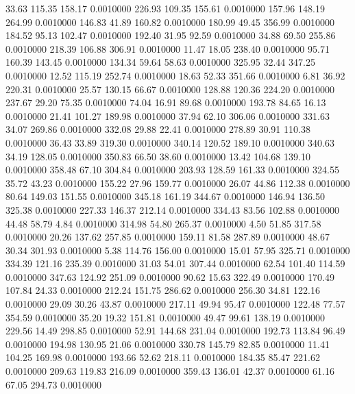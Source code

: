   33.63  115.35  158.17   0.0010000
 226.93  109.35  155.61   0.0010000
 157.96  148.19  264.99   0.0010000
 146.83   41.89  160.82   0.0010000
 180.99   49.45  356.99   0.0010000
 184.52   95.13  102.47   0.0010000
 192.40   31.95   92.59   0.0010000
  34.88   69.50  255.86   0.0010000
 218.39  106.88  306.91   0.0010000
  11.47   18.05  238.40   0.0010000
  95.71  160.39  143.45   0.0010000
 134.34   59.64   58.63   0.0010000
 325.95   32.44  347.25   0.0010000
  12.52  115.19  252.74   0.0010000
  18.63   52.33  351.66   0.0010000
   6.81   36.92  220.31   0.0010000
  25.57  130.15   66.67   0.0010000
 128.88  120.36  224.20   0.0010000
 237.67   29.20   75.35   0.0010000
  74.04   16.91   89.68   0.0010000
 193.78   84.65   16.13   0.0010000
  21.41  101.27  189.98   0.0010000
  37.94   62.10  306.06   0.0010000
 331.63   34.07  269.86   0.0010000
 332.08   29.88   22.41   0.0010000
 278.89   30.91  110.38   0.0010000
  36.43   33.89  319.30   0.0010000
 340.14  120.52  189.10   0.0010000
 340.63   34.19  128.05   0.0010000
 350.83   66.50   38.60   0.0010000
  13.42  104.68  139.10   0.0010000
 358.48   67.10  304.84   0.0010000
 203.93  128.59  161.33   0.0010000
 324.55   35.72   43.23   0.0010000
 155.22   27.96  159.77   0.0010000
  26.07   44.86  112.38   0.0010000
  80.64  149.03  151.55   0.0010000
 345.18  161.19  344.67   0.0010000
 146.94  136.50  325.38   0.0010000
 227.33  146.37  212.14   0.0010000
 334.43   83.56  102.88   0.0010000
  44.48   58.79    4.84   0.0010000
 314.98   54.80  265.37   0.0010000
   4.50   51.85  317.58   0.0010000
  20.26  137.62  257.85   0.0010000
 159.11   81.58  287.89   0.0010000
  48.67   30.34  301.93   0.0010000
   5.38  114.76  156.00   0.0010000
  15.01   57.95  325.71   0.0010000
 334.39  121.16  235.39   0.0010000
  31.03   54.01  307.44   0.0010000
  62.54  101.40  114.59   0.0010000
 347.63  124.92  251.09   0.0010000
  90.62   15.63  322.49   0.0010000
 170.49  107.84   24.33   0.0010000
 212.24  151.75  286.62   0.0010000
 256.30   34.81  122.16   0.0010000
  29.09   30.26   43.87   0.0010000
 217.11   49.94   95.47   0.0010000
 122.48   77.57  354.59   0.0010000
  35.20   19.32  151.81   0.0010000
  49.47   99.61  138.19   0.0010000
 229.56   14.49  298.85   0.0010000
  52.91  144.68  231.04   0.0010000
 192.73  113.84   96.49   0.0010000
 194.98  130.95   21.06   0.0010000
 330.78  145.79   82.85   0.0010000
  11.41  104.25  169.98   0.0010000
 193.66   52.62  218.11   0.0010000
 184.35   85.47  221.62   0.0010000
 209.63  119.83  216.09   0.0010000
 359.43  136.01   42.37   0.0010000
  61.16   67.05  294.73   0.0010000
